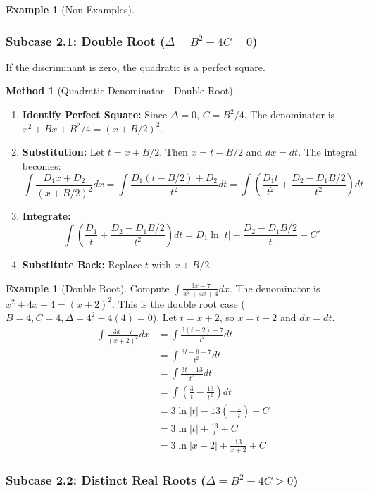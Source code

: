 \documentclass[11pt]{article}
\theoremstyle{plain}
\theoremstyle{definition}
\newtheorem{example}[theorem]{Example}
\newtheorem{method}[theorem]{Method}
\theoremstyle{remark}
\newcommand{\abs}[1]{\left|#1\right|}
\begin{document}
\begin{example}[Non-Examples]
\subsubsection{Subcase 2.1: Double Root ($\Delta = B^2-4C = 0$)}

If the discriminant is zero, the quadratic is a perfect square.

\begin{method}[Quadratic Denominator - Double Root]
\leavevmode
\begin{enumerate}
    \item \textbf{Identify Perfect Square:} Since $\Delta=0$, $C = B^2/4$. The denominator is $x^2+Bx+B^2/4 = (x+B/2)^2$.
    \item \textbf{Substitution:} Let $t = x+B/2$. Then $x=t-B/2$ and $dx=dt$. The integral becomes:
    \[ \int \frac{D_1 x + D_2}{(x+B/2)^2} dx = \int \frac{D_1(t-B/2) + D_2}{t^2} dt = \int \left( \frac{D_1 t}{t^2} + \frac{D_2 - D_1 B/2}{t^2} \right) dt \]
    \item \textbf{Integrate:}
    \[ \int \left( \frac{D_1}{t} + \frac{D_2 - D_1 B/2}{t^2} \right) dt = D_1 \ln\abs{t} - \frac{D_2 - D_1 B/2}{t} + C' \]
    \item \textbf{Substitute Back:} Replace $t$ with $x+B/2$.
\end{enumerate}
\end{method}

\begin{example}[Double Root]
Compute $\int \frac{3x-7}{x^2+4x+4} dx$.
The denominator is $x^2+4x+4 = (x+2)^2$. This is the double root case ($B=4, C=4, \Delta=4^2-4(4)=0$).
Let $t = x+2$, so $x=t-2$ and $dx=dt$.
\begin{align*} \int \frac{3x-7}{(x+2)^2} dx &= \int \frac{3(t-2)-7}{t^2} dt \\ &= \int \frac{3t - 6 - 7}{t^2} dt \\ &= \int \frac{3t - 13}{t^2} dt \\ &= \int \left( \frac{3}{t} - \frac{13}{t^2} \right) dt \\ &= 3 \ln\abs{t} - 13 \left( -\frac{1}{t} \right) + C \\ &= 3 \ln\abs{t} + \frac{13}{t} + C \\ &= 3 \ln\abs{x+2} + \frac{13}{x+2} + C \end{align*}
\end{example}

\subsubsection{Subcase 2.2: Distinct Real Roots ($\Delta = B^2-4C > 0$)}


\end{example}
\end{document}
